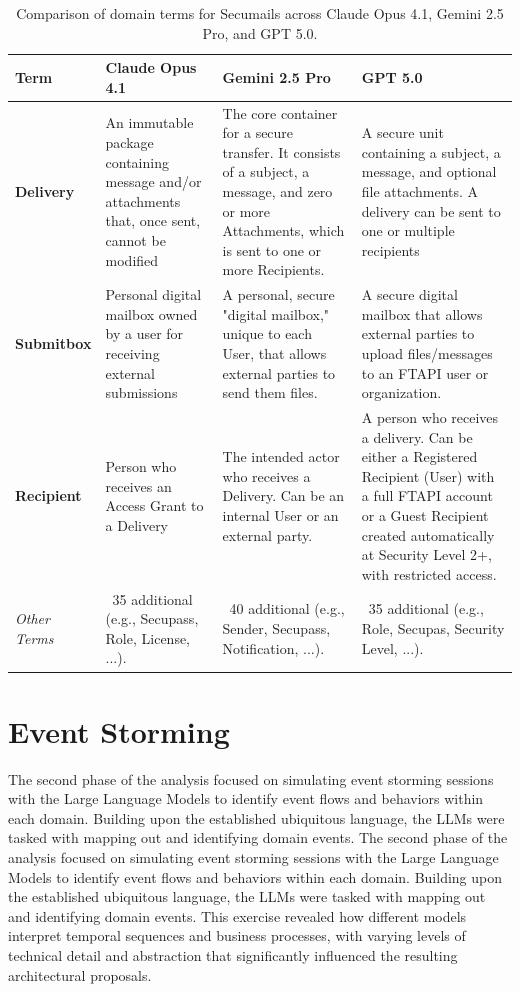 \begin{table}[H]
    \centering
    \begin{tabular}{|p{2.5cm}|p{4cm}|p{4cm}|p{4cm}|}
    \hline
    \rowcolor{gray!20}
    \textbf{Term} & \textbf{Claude Opus 4.1} & \textbf{Gemini 2.5 Pro} & \textbf{GPT 5.0} \\
    \hline
    \textbf{Delivery} & 
    An immutable package containing message and/or attachments that, once sent, cannot be modified &
    The core container for a secure transfer. It consists of a subject, a message, and zero or more Attachments, which is sent to one or more Recipients. &
    A secure unit containing a subject, a message, and optional file attachments. A delivery can be sent to one or multiple recipients \\
    \hline
    \textbf{Submitbox} & 
    Personal digital mailbox owned by a user for receiving external submissions&
    A personal, secure "digital mailbox," unique to each User, that allows external parties to send them files. &
    A secure digital mailbox that allows external parties to upload files/messages to an FTAPI user or organization. \\
    \hline
    \textbf{Recipient} & 
    Person who receives an Access Grant to a Delivery &
    The intended actor who receives a Delivery. Can be an internal User or an external party. &
    A person who receives a delivery. Can be either a Registered Recipient (User) with a full FTAPI account or a Guest Recipient created automatically at Security Level 2+, with restricted access. \\
    \hline
    \rowcolor{gray!10}
    \textit{Other Terms} & 
    ~35 additional (e.g., Secupass, Role, License, ...). &
    ~40 additional (e.g., Sender, Secupass, Notification, ...). &
    ~35 additional (e.g., Role, Secupas, Security Level, ...). \\
    \hline
    \end{tabular}
    \caption{Comparison of domain terms for Secumails across Claude Opus 4.1, Gemini 2.5 Pro, and GPT 5.0.}
    \label{tab:secumails-ubiquitous-language}
\end{table}

\section{Event Storming}
The second phase of the analysis focused on simulating event storming sessions with the Large Language Models to identify event flows and behaviors within each domain. Building upon the established ubiquitous language, the LLMs were tasked with mapping out and identifying domain events. The second phase of the analysis focused on simulating event storming sessions with the Large Language Models to identify event flows and behaviors within each domain. Building upon the established ubiquitous language, the LLMs were tasked with mapping out and identifying domain events. This exercise revealed how different models interpret temporal sequences and business processes, with varying levels of technical detail and abstraction that significantly influenced the resulting architectural proposals.

